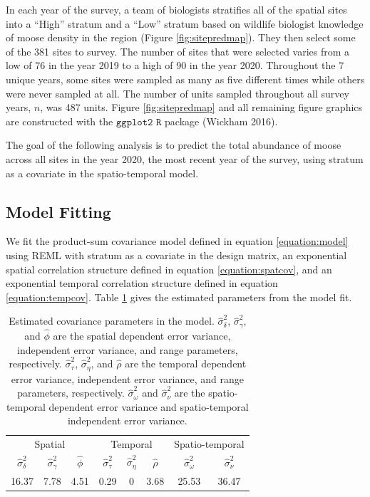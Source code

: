 \documentclass[]{article}    %
\begin{document}
In each year of the survey, a team of biologists stratifies all of the
spatial sites into a ``High'' stratum and a ``Low'' stratum based on
wildlife biologist knowledge of moose density in the region (Figure
\ref{fig:sitepredmap}). They then select some of the 381 sites to
survey. The number of sites that were selected varies from a low of 76
in the year 2019 to a high of 90 in the year 2020. Throughout the 7
unique years, some sites were sampled as many as five different times
while others were never sampled at all. The number of units sampled
throughout all survey years, \(n\), was 487 units. Figure
\ref{fig:sitepredmap} and all remaining figure graphics are constructed
with the \(\texttt{ggplot2 R}\) package (Wickham 2016).

The goal of the following analysis is to predict the total abundance of
moose across all sites in the year 2020, the most recent year of the
survey, using stratum as a covariate in the spatio-temporal model.

\hypertarget{subsection:modelfit}{%
\subsection{Model Fitting}\label{subsection:modelfit}}

We fit the product-sum covariance model defined in equation
\ref{equation:model} using REML with stratum as a covariate in the
design matrix, an exponential spatial correlation structure defined in
equation \ref{equation:spatcov}, and an exponential temporal correlation
structure defined in equation \ref{equation:tempcov}. Table
\ref{tab:paramest} gives the estimated parameters from the model fit.

\begin{table}[H]

\caption{\label{tab:paramest}Estimated covariance parameters in the model. $\hat{\sigma}^2_{\delta}$, $\hat{\sigma}^2_{\gamma}$, and $\hat{\phi}$ are the spatial dependent error variance, independent error variance, and range parameters, respectively. $\hat{\sigma}^2_{\tau}$, $\hat{\sigma}^2_{\eta}$, and $\hat{\rho}$ are the temporal dependent error variance, independent error variance, and range parameters, respectively. $\hat{\sigma}^2_{\omega}$ and $\hat{\sigma}^2_{\nu}$ are the spatio-temporal dependent error variance and spatio-temporal independent error variance.}
\centering
\begin{tabular}[t]{cccccccc}
\toprule
\multicolumn{3}{c}{Spatial} & \multicolumn{3}{c}{Temporal} & \multicolumn{2}{c}{Spatio-temporal} \\
\cmidrule(l{3pt}r{3pt}){1-3} \cmidrule(l{3pt}r{3pt}){4-6} \cmidrule(l{3pt}r{3pt}){7-8}
$\hat{\sigma}^2_{\delta}$ & $\hat{\sigma}^2_{\gamma}$ & $\hat{\phi}$ & $\hat{\sigma}^2_{\tau}$ & $\hat{\sigma}^2_{\eta}$ & $\hat{\rho}$ & $\hat{\sigma}^2_{\omega}$ & $\hat{\sigma}^2_{\nu}$\\
\midrule
16.37 & 7.78 & 4.51 & 0.29 & 0 & 3.68 & 25.53 & 36.47\\
\bottomrule
\end{tabular}
\end{table}
\end{document}

